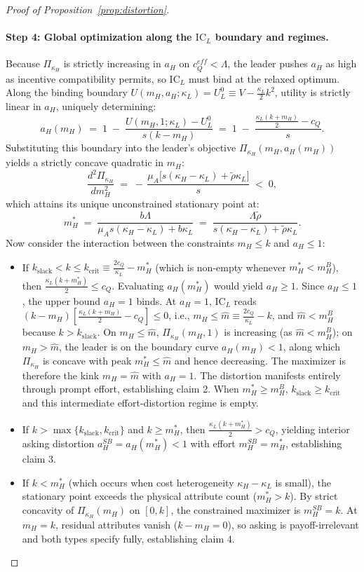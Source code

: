 \documentclass[11pt]{article}
\begin{document}
\begin{proof}[Proof of Proposition~\ref{prop:distortion}]
\paragraph{Step 4: Global optimization along the $\text{IC}_L$ boundary and regimes.}
Because $\Pi_{\kappa_H}$ is strictly increasing in $a_H$ on $c_Q^{eff} < \Lambda$, the leader pushes $a_H$ as high as incentive compatibility permits, so $\text{IC}_L$ must bind at the relaxed optimum. Along the binding boundary $U(m_H, a_H; \kappa_L) = U_L^0 \equiv V - \frac{\kappa_L}{2}k^2$, utility is strictly linear in $a_H$, uniquely determining:
\[
a_H(m_H) \;=\; 1 \;-\; \frac{U(m_H, 1; \kappa_L) - U_L^0}{s(k - m_H)} \;=\; 1 \;-\; \frac{\frac{\kappa_L(k + m_H)}{2} - c_Q}{s}.
\]
Substituting this boundary into the leader's objective $\Pi_{\kappa_H}(m_H, a_H(m_H))$ yields a strictly concave quadratic in $m_H$:
\[
\frac{d^2 \Pi_{\kappa_H}}{dm_H^2} \;=\; -\,\frac{\mu_A\big[s(\kappa_H - \kappa_L) + \tilde\rho\kappa_L\big]}{s} \;<\; 0,
\]
which attains its unique unconstrained stationary point at:
\[
m_H^* \;=\; \frac{b\Lambda}{\mu_A s(\kappa_H - \kappa_L) + b\kappa_L} \;=\; \frac{\Lambda \tilde\rho}{s(\kappa_H - \kappa_L) + \tilde\rho\kappa_L}.
\]
Now consider the interaction between the constraints $m_H \le k$ and $a_H \le 1$:
\begin{itemize}[leftmargin=*]
\item If $k_{\text{slack}} < k \le k_{\text{crit}} \equiv \frac{2 c_Q}{\kappa_L} - m_H^*$ (which is non-empty whenever $m_H^* < m_H^B$), then $\frac{\kappa_L(k + m_H^*)}{2} \le c_Q$. Evaluating $a_H(m_H^*)$ would yield $a_H \ge 1$. Since $a_H \le 1$, the upper bound $a_H = 1$ binds. At $a_H = 1$, $\text{IC}_L$ reads $(k - m_H)[\frac{\kappa_L(k + m_H)}{2} - c_Q] \le 0$, i.e., $m_H \le \hat m \equiv \frac{2 c_Q}{\kappa_L} - k$, and $\hat m < m_H^B$ because $k > k_{\text{slack}}$. On $m_H \le \hat m$, $\Pi_{\kappa_H}(m_H, 1)$ is increasing (as $\hat m < m_H^B$); on $m_H > \hat m$, the leader is on the boundary curve $a_H(m_H) < 1$, along which $\Pi_{\kappa_H}$ is concave with peak $m_H^* \le \hat m$ and hence decreasing. The maximizer is therefore the kink $m_H = \hat m$ with $a_H = 1$. The distortion manifests entirely through prompt effort, establishing claim 2. When $m_H^* \ge m_H^B$, $k_{\text{slack}} \ge k_{\text{crit}}$ and this intermediate effort-distortion regime is empty.
\item If $k > \max\{k_{\text{slack}}, k_{\text{crit}}\}$ and $k \ge m_H^*$, then $\frac{\kappa_L(k + m_H^*)}{2} > c_Q$, yielding interior asking distortion $a_H^{SB} = a_H(m_H^*) < 1$ with effort $m_H^{SB} = m_H^*$, establishing claim 3.
\item If $k < m_H^*$ (which occurs when cost heterogeneity $\kappa_H - \kappa_L$ is small), the stationary point exceeds the physical attribute count ($m_H^* > k$). By strict concavity of $\Pi_{\kappa_H}(m_H)$ on $[0, k]$, the constrained maximizer is $m_H^{SB} = k$. At $m_H = k$, residual attributes vanish ($k - m_H = 0$), so asking is payoff-irrelevant and both types specify fully, establishing claim 4.
\end{itemize}


\end{proof}
\end{document}
